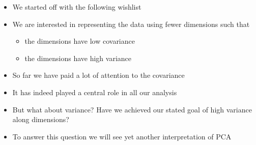 
\begin{frame}
\end{frame}

\begin{frame}
  \begin{overlayarea}{\textwidth}{\textheight}
    \vspace{1.2cm}
    \begin{itemize}\justifying
      \item<1-> We started off with the following wishlist
      \item<2-> We are interested in representing the data using fewer dimensions such that
            \begin{itemize}\justifying
              \item<3-> the dimensions have low covariance
              \item<4-> the dimensions have high variance
            \end{itemize}
      \item<5-> So far we have paid a lot of attention to the covariance
      \item<6-> It has indeed played a central role in all our analysis
      \item<7-> But what about variance? Have we achieved our stated goal of high variance along dimensions?
      \item<8-> To answer this question we will see yet another interpretation of PCA
    \end{itemize}
  \end{overlayarea}
\end{frame}

